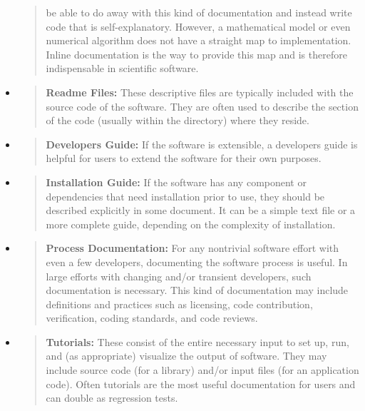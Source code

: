 \documentclass[]{article}
\begin{document}
\begin{itemize}
\begin{quote}
  be able to do away with this kind of documentation and instead write
  code that is self-explanatory. However, a mathematical model or even
  numerical algorithm does not have a straight map to implementation.
  Inline documentation is the way to provide this map and is therefore
  indispensable in scientific software.
  \end{quote}
\item
  \begin{quote}
  \textbf{Readme Files:} These descriptive files are typically included
  with the source code of the software. They are often used to describe
  the section of the code (usually within the directory) where they
  reside.
  \end{quote}
\item
  \begin{quote}
  \textbf{Developers Guide:} If the software is extensible, a developers
  guide is helpful for users to extend the software for their own
  purposes.
  \end{quote}
\item
  \begin{quote}
  \textbf{Installation Guide:} If the software has any component or
  dependencies that need installation prior to use, they should be
  described explicitly in some document. It can be a simple text file or
  a more complete guide, depending on the complexity of installation.
  \end{quote}
\item
  \begin{quote}
  \textbf{Process Documentation:} For any nontrivial software effort
  with even a few developers, documenting the software process is
  useful. In large efforts with changing and/or transient developers,
  such documentation is necessary. This kind of documentation may
  include definitions and practices such as licensing, code
  contribution, verification, coding standards, and code reviews.
  \end{quote}
\item
  \begin{quote}
  \textbf{Tutorials:} These consist of the entire necessary input to set
  up, run, and (as appropriate) visualize the output of software. They
  may include source code (for a library) and/or input files (for an
  application code). Often tutorials are the most useful documentation
  for users and can double as regression tests.
  \end{quote}
\end{itemize}
\end{document}
